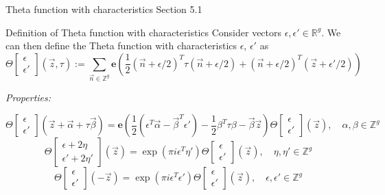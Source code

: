 \documentclass[11pt,aspectratio=169]{beamer}
\newcommand{\ee}[0]{\mathbf{e}}
\begin{document}
\begin{frame}{Theta function with characteristics}{\tiny \cite{Ber06} Section 5.1}
    \begin{block}{Definition of Theta function with characteristics}
        Consider vectors $ \epsilon ,  \epsilon' \in \mathbb R^g$.
        We can then define the Theta function with characteristics $ \epsilon$, $ \epsilon'$ as
        \[\Theta\begin{bmatrix}\epsilon \\ \epsilon'\end{bmatrix}(\vec z, \tau) := \sum_{\vec n \in \mathbb Z^g} \ee 
        \left( \frac{1}{2} (\vec n+\epsilon/2)^T \tau (\vec n+\epsilon/2) + (\vec n+\epsilon/2)^T (\vec z+\epsilon'/2) \right)\]
    \end{block}

    \emph{Properties:}

    \[\Theta\begin{bmatrix}\epsilon \\ \epsilon'\end{bmatrix}(\vec z + \vec \alpha + \tau \vec \beta) =
    \ee\left(\frac{1}{2}(\epsilon^T \vec \alpha - \vec \beta^T \epsilon') - \frac{1}{2} \beta^T \tau \beta - \vec \beta \vec z\right)
    \Theta\begin{bmatrix}\epsilon \\ \epsilon'\end{bmatrix}(\vec z), \quad \alpha,\beta \in \mathbb Z^g\]
    \[\Theta\begin{bmatrix}\epsilon + 2\eta \\ \epsilon' + 2\eta' \end{bmatrix}(\vec z) = \exp(\pi i \epsilon^T \eta')
    \Theta\begin{bmatrix}\epsilon \\ \epsilon'\end{bmatrix}(\vec z) , \quad \eta,\eta' \in \mathbb Z^g\]
    \[\Theta\begin{bmatrix}\epsilon \\ \epsilon'\end{bmatrix}(-\vec z) = \exp(\pi i \epsilon^T \epsilon') \Theta\begin{bmatrix}\epsilon \\ \epsilon'\end{bmatrix}(\vec z) , \quad \epsilon,\epsilon' \in \mathbb Z^g\]
\end{frame}
\end{document}

